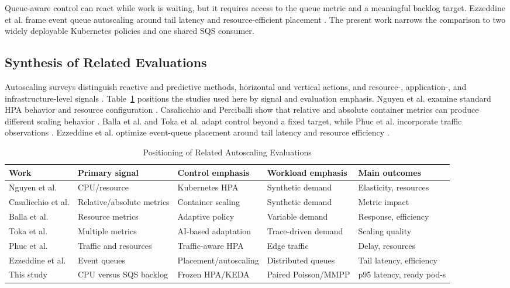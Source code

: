 \documentclass[conference]{IEEEtran}
\begin{document}
Queue-aware control can react while work is waiting, but it requires access to
the queue metric and a meaningful backlog target. Ezzeddine et al. frame event
queue autoscaling around tail latency and resource-efficient placement
\cite{Ezzeddine2024EventQueues}. The present work narrows the comparison to two
widely deployable Kubernetes policies and one shared SQS consumer.

\subsection{Synthesis of Related Evaluations}

Autoscaling surveys distinguish reactive and predictive methods, horizontal
and vertical actions, and resource-, application-, and infrastructure-level
signals \cite{Tran2022Survey}. Table~\ref{tab:related} positions the studies
used here by signal and evaluation emphasis. Nguyen et al. examine standard HPA
behavior and resource configuration \cite{Nguyen2020HPA}. Casalicchio and
Perciballi show that relative and absolute container metrics can produce
different scaling behavior \cite{Casalicchio2017Metrics}. Balla et al. and Toka
et al. adapt control beyond a fixed target, while Phuc et al. incorporate
traffic observations \cite{Balla2020Adaptive,Toka2020Adaptive,
Phuc2022TrafficAware}. Ezzeddine et al. optimize event-queue placement around
tail latency and resource efficiency \cite{Ezzeddine2024EventQueues}.

\begin{table}[t]
  \caption{Positioning of Related Autoscaling Evaluations}
  \label{tab:related}
  \centering
  \begin{tabular}{lllll}
    \toprule
    Work & Primary signal & Control emphasis & Workload emphasis & Main outcomes \\
    \midrule
    Nguyen et al. \cite{Nguyen2020HPA} & CPU/resource & Kubernetes HPA & Synthetic demand & Elasticity, resources \\
    Casalicchio et al. \cite{Casalicchio2017Metrics} & Relative/absolute metrics & Container scaling & Synthetic demand & Metric impact \\
    Balla et al. \cite{Balla2020Adaptive} & Resource metrics & Adaptive policy & Variable demand & Response, efficiency \\
    Toka et al. \cite{Toka2020Adaptive} & Multiple metrics & AI-based adaptation & Trace-driven demand & Scaling quality \\
    Phuc et al. \cite{Phuc2022TrafficAware} & Traffic and resources & Traffic-aware HPA & Edge traffic & Delay, resources \\
    Ezzeddine et al. \cite{Ezzeddine2024EventQueues} & Event queues & Placement/autoscaling & Distributed queues & Tail latency, efficiency \\
    This study & CPU versus SQS backlog & Frozen HPA/KEDA & Paired Poisson/MMPP & p95 latency, ready pod-s \\
    \bottomrule
  \end{tabular}
\end{table}
\end{document}
